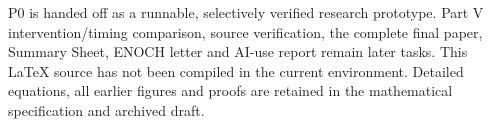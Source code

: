 \documentclass[11pt]{article}
\begin{document}
P0 is handed off as a runnable, selectively verified research prototype. Part V
intervention/timing comparison, source verification, the complete final paper,
Summary Sheet, ENOCH letter and AI-use report remain later tasks. This LaTeX source
has not been compiled in the current environment. Detailed equations, all earlier
figures and proofs are retained in the mathematical specification and archived draft.
\end{document}
